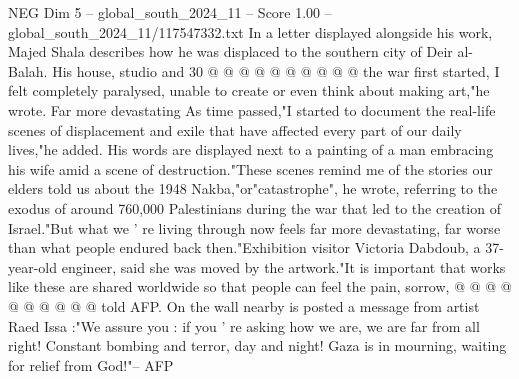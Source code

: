 \begin{textsample}{NEG Dim 5 – global\_south\_2024\_11 – Score 1.00 – global\_south\_2024\_11/117547332.txt}
In a letter displayed alongside his work, Majed Shala describes how he was displaced to the southern city of Deir al-Balah.
His house, studio and 30 @ @ @ @ @ @ @ @ @ @ the war first started, I felt completely paralysed, unable to create or even think about making art,"he wrote.
Far more devastating As time passed,"I started to document the real-life scenes of displacement and exile that have affected every part of our daily lives,"he added.
His words are displayed next to a painting of a man embracing his wife amid a scene of destruction."These scenes remind me of the stories our elders told us about the 1948 Nakba,"or"catastrophe", he wrote, referring to the exodus of around 760,000 Palestinians during the war that led to the creation of Israel."But what we ' re living through now feels far more devastating, far worse than what people endured back then."Exhibition visitor Victoria Dabdoub, a 37-year-old engineer, said she was moved by the artwork."It is important that works like these are shared worldwide so that people can feel the pain, sorrow, @ @ @ @ @ @ @ @ @ @ told AFP.
On the wall nearby is posted a message from artist Raed Issa :"We assure you : if you ' re asking how we are, we are far from all right!
Constant bombing and terror, day and night!
Gaza is in mourning, waiting for relief from God!"-- AFP

\end{textsample}

